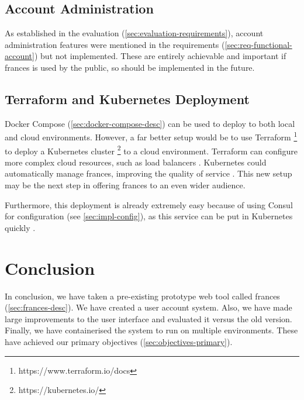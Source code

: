 \documentclass[12pt, letterpaper]{article}
\begin{document}
\subsection{Account Administration}\label{sec:future-accounts}

\begin{flushleft}
As established in the evaluation (\ref{sec:evaluation-requirements}), account administration features were mentioned in the requirements (\ref{sec:req-functional-account}) but not implemented. These are entirely achievable and important if frances is used by the public, so should be implemented in the future.
\end{flushleft}

\subsection{Terraform and Kubernetes Deployment}\label{sec:future-terraform-k8s}

\begin{flushleft}
Docker Compose (\ref{sec:docker-compose-desc}) can be used to deploy to both local and cloud environments. However, a far better setup would be to use Terraform \footnote{https://www.terraform.io/docs} to deploy a Kubernetes cluster \footnote{https://kubernetes.io/} to a cloud environment. Terraform can configure more complex cloud resources, such as load balancers \cite{terraform}. Kubernetes could automatically manage frances, improving the quality of service \cite{kubernetes}. This new setup may be the next step in offering frances to an even wider audience.
\end{flushleft}

\begin{flushleft}
Furthermore, this deployment is already extremely easy because of using Consul for configuration (see \ref{sec:impl-config}), as this service can be put in Kubernetes quickly \cite{consul-kubernetes}.
\end{flushleft}

\section{Conclusion}

\begin{flushleft}
In conclusion, we have taken a pre-existing prototype web tool called frances (\ref{sec:frances-desc}). We have created a user account system. Also, we have made large improvements to the user interface and evaluated it versus the old version. Finally, we have containerised the system to run on multiple environments. These have achieved our primary objectives (\ref{sec:objectives-primary}).
\end{flushleft}
\end{document}
